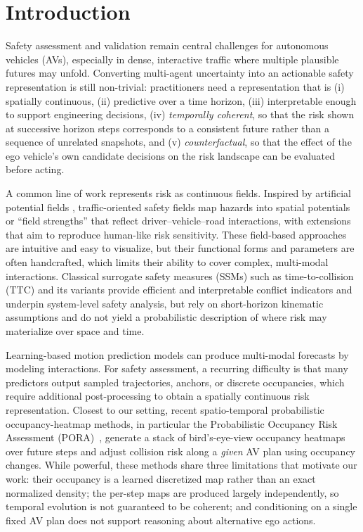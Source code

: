 \documentclass[journal]{IEEEtran}
\begin{document}
\section{Introduction}\label{section:introduction}
Safety assessment and validation remain central challenges for autonomous vehicles (AVs), especially in dense, interactive traffic where multiple plausible futures may unfold. Converting multi-agent uncertainty into an actionable safety representation is still non-trivial: practitioners need a representation that is (i) spatially continuous, (ii) predictive over a time horizon, (iii) interpretable enough to support engineering decisions, (iv) \emph{temporally coherent}, so that the risk shown at successive horizon steps corresponds to a consistent future rather than a sequence of unrelated snapshots, and (v) \emph{counterfactual}, so that the effect of the ego vehicle's own candidate decisions on the risk landscape can be evaluated before acting.

A common line of work represents risk as continuous fields. Inspired by artificial potential fields \cite{xie2022distributed}, traffic-oriented safety fields map hazards into spatial potentials or ``field strengths'' that reflect driver--vehicle--road interactions, with extensions that aim to reproduce human-like risk sensitivity. These field-based approaches are intuitive and easy to visualize, but their functional forms and parameters are often handcrafted, which limits their ability to cover complex, multi-modal interactions. Classical surrogate safety measures (SSMs) such as time-to-collision (TTC) and its variants provide efficient and interpretable conflict indicators and underpin system-level safety analysis, but rely on short-horizon kinematic assumptions and do not yield a probabilistic description of where risk may materialize over space and time.

Learning-based motion prediction models can produce multi-modal forecasts by modeling interactions. For safety assessment, a recurring difficulty is that many predictors output sampled trajectories, anchors, or discrete occupancies, which require additional post-processing to obtain a spatially continuous risk representation. Closest to our setting, recent spatio-temporal probabilistic occupancy-heatmap methods, in particular the Probabilistic Occupancy Risk Assessment (PORA)~\cite{wang2025dynamic}, generate a stack of bird's-eye-view occupancy heatmaps over future steps and adjust collision risk along a \emph{given} AV plan using occupancy changes. While powerful, these methods share three limitations that motivate our work: their occupancy is a learned discretized map rather than an exact normalized density; the per-step maps are produced largely independently, so temporal evolution is not guaranteed to be coherent; and conditioning on a single fixed AV plan does not support reasoning about alternative ego actions.
\end{document}
